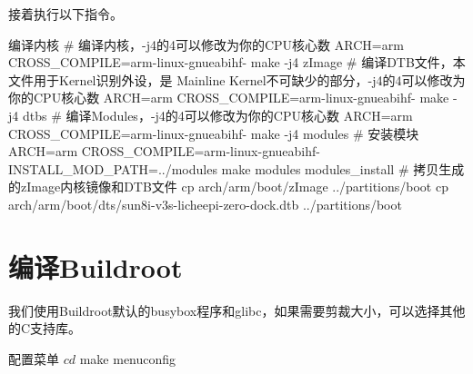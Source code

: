 \documentclass[lang=cn,newtx,10pt,scheme=chinese]{elegantbook}
\begin{document}
接着执行以下指令。

\begin{mycode}{编译内核}
# 编译内核，-j4的4可以修改为你的CPU核心数
ARCH=arm CROSS_COMPILE=arm-linux-gnueabihf- make -j4 zImage
# 编译DTB文件，本文件用于Kernel识别外设，是 Mainline Kernel不可缺少的部分，-j4的4可以修改为你的CPU核心数
ARCH=arm CROSS_COMPILE=arm-linux-gnueabihf- make -j4 dtbs
# 编译Modules，-j4的4可以修改为你的CPU核心数
ARCH=arm CROSS_COMPILE=arm-linux-gnueabihf- make -j4 modules
# 安装模块
ARCH=arm CROSS_COMPILE=arm-linux-gnueabihf- INSTALL_MOD_PATH=../modules  make modules modules_install
# 拷贝生成的zImage内核镜像和DTB文件
cp arch/arm/boot/zImage ../partitions/boot
cp arch/arm/boot/dts/sun8i-v3s-licheepi-zero-dock.dtb ../partitions/boot
\end{mycode}

\section{编译Buildroot}

我们使用Buildroot默认的busybox程序和glibc，如果需要剪裁大小，可以选择其他的C支持库。

\begin{mycode}{配置菜单}
$ cd
$ make menuconfig
\end{mycode}
\end{document}
